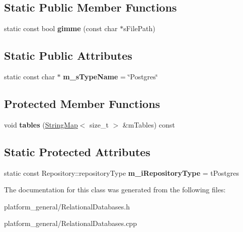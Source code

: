 \subsection*{\-Static \-Public \-Member \-Functions}
\begin{DoxyCompactItemize}
\item 
\hypertarget{classgeneral__server_1_1Postgres_a0b0f3b166d4a1bc684d746d5deccd604}{static const bool {\bfseries gimme} (const char $\ast$s\-File\-Path)}\label{classgeneral__server_1_1Postgres_a0b0f3b166d4a1bc684d746d5deccd604}

\end{DoxyCompactItemize}
\subsection*{\-Static \-Public \-Attributes}
\begin{DoxyCompactItemize}
\item 
\hypertarget{classgeneral__server_1_1Postgres_ab7189a987fda0ee7276c10b10fbc625d}{static const char $\ast$ {\bfseries m\-\_\-s\-Type\-Name} = \char`\"{}\-Postgres\char`\"{}}\label{classgeneral__server_1_1Postgres_ab7189a987fda0ee7276c10b10fbc625d}

\end{DoxyCompactItemize}
\subsection*{\-Protected \-Member \-Functions}
\begin{DoxyCompactItemize}
\item 
\hypertarget{classgeneral__server_1_1Postgres_a72b0e685ad52470f081714e3dc49ceee}{void {\bfseries tables} (\hyperlink{classgeneral__server_1_1StringMap}{\-String\-Map}$<$ size\-\_\-t $>$ \&m\-Tables) const }\label{classgeneral__server_1_1Postgres_a72b0e685ad52470f081714e3dc49ceee}

\end{DoxyCompactItemize}
\subsection*{\-Static \-Protected \-Attributes}
\begin{DoxyCompactItemize}
\item 
\hypertarget{classgeneral__server_1_1Postgres_ae54e2fe211d263604225af6f4b480039}{static const \*
\-Repository\-::repository\-Type {\bfseries m\-\_\-i\-Repository\-Type} = t\-Postgres}\label{classgeneral__server_1_1Postgres_ae54e2fe211d263604225af6f4b480039}

\end{DoxyCompactItemize}


\-The documentation for this class was generated from the following files\-:\begin{DoxyCompactItemize}
\item 
platform\-\_\-general/\-Relational\-Databases.\-h\item 
platform\-\_\-general/\-Relational\-Databases.\-cpp\end{DoxyCompactItemize}
